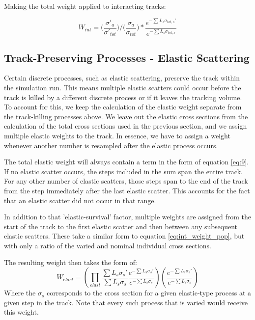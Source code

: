 \documentclass[12pt]{article}
\begin{document}
Making the total weight applied to interacting tracks:

\begin{equation}\label{eq:int_weight_pop}
  W_{int} = \big(\frac{\sigma'_a}{\sigma'_{tot}}\big)/\big(\frac{\sigma_a}{\sigma_{tot}}\big) * \frac{e^{-\sum L_s  \sigma_{tot,s}'}}{e^{-\sum L_s  \sigma_{tot,s}}}
\end{equation}

\subsection{Track-Preserving Processes - Elastic Scattering}
Certain discrete processes, such as elastic scattering, preserve the track within the simulation run. This means multiple elastic scatters could occur before the track is killed by a different discrete process or if it leaves the tracking volume. To account for this, we keep the calculation of the elastic weight separate from the track-killing processes above. We leave out the elastic cross sections from the calculation of the total cross sections used in the previous section, and we assign multiple elastic weights to the track. In essence, we have to assign a weight whenever another number is resampled after the elastic process occurs. 

The total elastic weight will always contain a term in the form of equation \ref{eq:9}. If no elastic scatter occurs, the steps included in the sum span the entire track. For any other number of elastic scatters, those steps span to the end of the track from the step immediately after the last elastic scatter. This accounts for the fact that an elastic scatter did not occur in that range. 

In addition to that 'elastic-survival' factor, multiple weights are assigned from the start of the track to the first elastic scatter and then between any subsequent elastic scatters. These take a similar form to equation \ref{eq:int_weight_pop}, but with only a ratio of the varied and nominal individual cross sections.

The resulting weight then takes the form of:
\begin{equation}\label{ref:elastFull}
W_{elast} = (\prod \limits_{elast} \frac{\sum L_s \sigma_s'}{\sum L_s \sigma_s} \frac{e^{-\sum L_s  \sigma_{s}'}}{e^{-\sum L_s  \sigma_{s}}})(\frac{e^{-\sum L_s \sigma_{s}'}}{e^{-\sum L_s \sigma_{s}}})
\end{equation}
Where the $\sigma_s$ corresponds to the cross section for a given elastic-type process at a given step in the track. Note that every such process that is varied would receive this weight.
%
%
%
\end{document}
